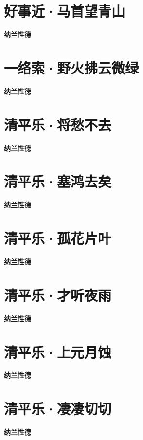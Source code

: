 \documentclass[12pt,a4paper]{ctexbook}
\begin{document}
\section{好事近·马首望青山}
\textbf{纳兰性德}\par\vspace{0.5em}

\section{一络索·野火拂云微绿}
\textbf{纳兰性德}\par\vspace{0.5em}

\section{清平乐·将愁不去}
\textbf{纳兰性德}\par\vspace{0.5em}

\section{清平乐·塞鸿去矣}
\textbf{纳兰性德}\par\vspace{0.5em}

\section{清平乐·孤花片叶}
\textbf{纳兰性德}\par\vspace{0.5em}

\section{清平乐·才听夜雨}
\textbf{纳兰性德}\par\vspace{0.5em}

\section{清平乐·上元月蚀}
\textbf{纳兰性德}\par\vspace{0.5em}

\section{清平乐·凄凄切切}
\textbf{纳兰性德}\par\vspace{0.5em}
\end{document}
